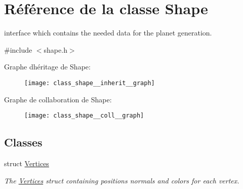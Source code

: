 \hypertarget{class_shape}{}\section{Référence de la classe Shape}
\label{class_shape}


interface which contains the needed data for the planet generation.  




{\ttfamily \#include $<$shape.\+h$>$}



Graphe d\textquotesingle{}héritage de Shape\+:\nopagebreak
\begin{figure}[H]
\begin{center}
\leavevmode
\texttt{[image: class\_shape\_\_inherit\_\_graph]}
\end{center}
\end{figure}


Graphe de collaboration de Shape\+:\nopagebreak
\begin{figure}[H]
\begin{center}
\leavevmode
\texttt{[image: class\_shape\_\_coll\_\_graph]}
\end{center}
\end{figure}
\subsection*{Classes}
\begin{DoxyCompactItemize}
\item 
struct \hyperlink{struct_shape_1_1_vertices}{Vertices}
\begin{DoxyCompactList}\small\item\em The \hyperlink{struct_shape_1_1_vertices}{Vertices} struct containing positions normals and colors for each vertex. \end{DoxyCompactList}\end{DoxyCompactItemize}
